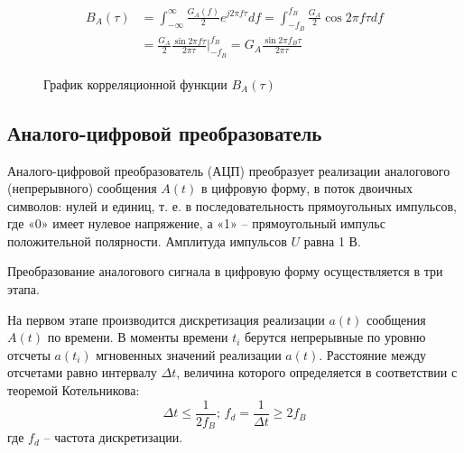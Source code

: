 \documentclass[a4paper, 12pt]{article}
\begin{document}
\begin{enumerate}
  \begin{align*}\begin{split}
    B_A(\tau)&=\int^\infty_{-\infty}\frac{G_A(f)}{2}e^{j2\pi f\tau}df
    =\int^{f_B}_{-f_B}\frac{G_A}{2}\cos{2\pi f\tau}df\\
    &=\frac{G_A}2 \frac{\sin{2\pi f \tau}}{2\pi \tau}\Biggr|^{f_B}_{-f_B} 
    =G_A\frac{\sin{2\pi f_B \tau}}{2\pi\tau}
  \end{split}\end{align*}
  \begin{figure}[H]
    \centering
    \caption{График корреляционной функции $B_A(\tau)$}
    \label{fig:coorel_plot}
  \end{figure}
\end{enumerate}

\subsection{Аналого-цифровой преобразователь}
Аналого-цифровой преобразователь (АЦП) преобразует реализации 
аналогового (непрерывного) сообщения $A(t)$ в цифровую 
форму, в поток двоичных символов: нулей и единиц, 
т. е. в последовательность прямоугольных импульсов, 
где «0» имеет нулевое напряжение, а «1» -- прямоугольный 
импульс положительной полярности. 
Амплитуда импульсов $U$ равна 1 В.

Преобразование аналогового сигнала в цифровую форму 
осуществляется в три этапа.

На первом этапе производится дискретизация реализации 
$a(t)$ сообщения $A(t)$ по времени. В моменты времени $t_i$ 
берутся непрерывные по уровню отсчеты $a(t_i)$ 
мгновенных значений реализации $a(t)$. Расстояние
между отсчетами равно интервалу $\Delta t$, величина которого
определяется в соответствии с теоремой Котельникова:
\[\Delta t \leq \frac{1}{2f_B};\, 
f_d=\frac{1}{\Delta t}\geq2f_B\]
где $f_d$ -- частота дискретизации.
\end{document}
